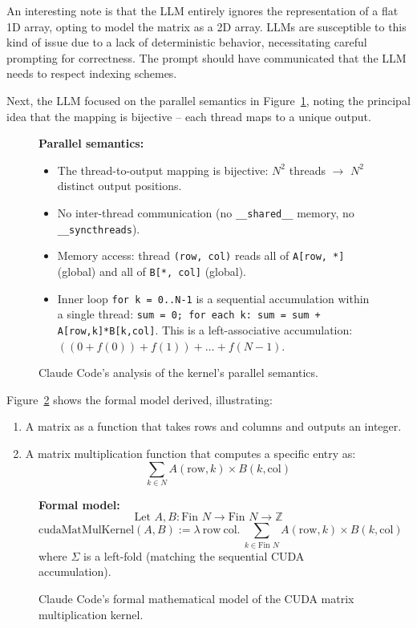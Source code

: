 \documentclass{article}
\begin{document}
An interesting note is that the LLM entirely ignores the representation of a flat 1D array, opting to model the matrix as a 2D array. LLMs are susceptible to this kind of issue due to a lack of deterministic behavior, necessitating careful prompting for correctness. The prompt should have communicated that the LLM needs to respect indexing schemes.

Next, the LLM focused on the parallel semantics in Figure~\ref{fig:lean-parallel-semantics}, noting the principal idea that the mapping is bijective -- each thread maps to a unique output.

\begin{figure}[H]
\begin{promptbox}
\textbf{Parallel semantics:}
\begin{itemize}
    \item The thread-to-output mapping is bijective: $N^2$ threads $\rightarrow$ $N^2$ distinct output positions.
    \item No inter-thread communication (no \texttt{\_\_shared\_\_} memory, no \texttt{\_\_syncthreads}).
    \item Memory access: thread \texttt{(row, col)} reads all of \texttt{A[row, *]} (global) and all of \texttt{B[*, col]} (global).
    \item Inner loop \texttt{for k = 0..N-1} is a sequential accumulation within a single thread:
    \texttt{sum = 0; for each k: sum = sum + A[row,k]*B[k,col]}. This is a left-associative accumulation: $((0 + f(0)) + f(1)) + \ldots + f(N-1)$.
\end{itemize}
\end{promptbox}
\caption{Claude Code's analysis of the kernel's parallel semantics.}
\label{fig:lean-parallel-semantics}
\end{figure}

Figure~\ref{fig:lean-formal-model} shows the formal model derived, illustrating:

\begin{enumerate}
    \item A matrix as a function that takes rows and columns and outputs an integer.
    \item A matrix multiplication function that computes a specific entry as:
    $$\sum_{k \in N} A(\mathrm{row}, k) \times B(k, \mathrm{col})$$
\end{enumerate}

\begin{figure}[H]
\begin{promptbox}
\textbf{Formal model:}
$$\text{Let } A, B : \text{Fin } N \rightarrow \text{Fin } N \rightarrow \mathbb{Z}$$
$$\text{cudaMatMulKernel}(A, B) := \lambda\ \text{row}\ \text{col}.\ \sum_{k \in \text{Fin } N} A(\text{row}, k) \times B(k, \text{col})$$
where $\Sigma$ is a left-fold (matching the sequential CUDA accumulation).
\end{promptbox}
\caption{Claude Code's formal mathematical model of the CUDA matrix multiplication kernel.}
\label{fig:lean-formal-model}
\end{figure}
\end{document}
